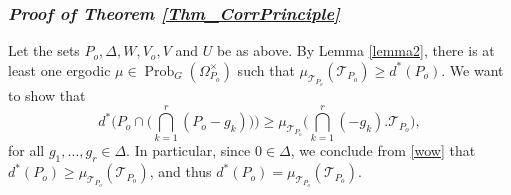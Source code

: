 \documentclass[12pt,reqno,a4paper]{amsart}
\numberwithin{equation}{section}
\newcommand{\cT}{\mathcal{T}}
\DeclareMathOperator{\Prob}{Prob}
\theoremstyle{theorem}
\theoremstyle{task}
\theoremstyle{definition}
\begin{document}
\subsubsection*{\textbf{\emph{Proof of Theorem \ref{Thm_CorrPrinciple}}}}

Let the sets $P_o, \Delta, W, V_o, V$ and $U$ be as above. By Lemma \ref{lemma2}, there is at least one ergodic $\mu \in \Prob_G(\Omega_{P_o}^{\times})$ such that $\mu_{\cT_{P_o}}(\cT_{P_o}) \geq d^*(P_o)$. We want to show that
\begin{equation}
\label{wow}
d^*\Big(P_o \cap \Big( \bigcap_{k=1}^r (P_o - g_k) \Big)\Big)
\geq 
\mu_{\cT_{P_o}}\Big(\bigcap_{k=1}^r (-g_k).\cT_{P_o}\Big),
\end{equation}
for all $g_1,\ldots,g_r \in \Delta$. In particular, since $0 \in \Delta$, we
conclude from \eqref{wow} that $d^*(P_o) \geq \mu_{\cT_{P_o}}(\cT_{P_o})$, and thus $d^*(P_o) = \mu_{\cT_{P_o}}(\cT_{P_o})$. \\
\end{document}
